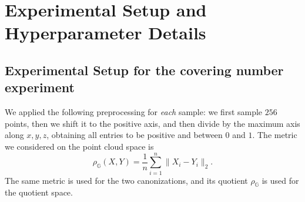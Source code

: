 \documentclass{article}
\theoremstyle{definition}
\theoremstyle{plain}
\newcommand{\D}{\mathcal{D}}
\newcommand{\G}{\mathbb{G}}
\begin{document}
\section{Experimental Setup and Hyperparameter Details}
\label{app:exp_setup}

\subsection{Experimental Setup for the covering number experiment}
We applied the following preprocessing for \emph{each} sample: we first sample $256$ points, then we shift it to the positive axis, and then divide by the maximum axis along $x,y,z$, obtaining all entries to be positive and between $0$ and $1$. The metric we considered on the point cloud space is 
$$\rho_{\G}(X,Y) = \frac{1}{n}\sum^{n}_{i=1}\|X_i-Y_i\|_2 .$$
The same metric is used for the two canonizations, and its quotient $\rho_\G$ is used for the quotient space. 
\end{document}
